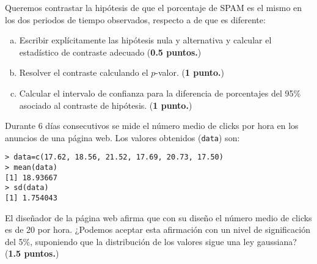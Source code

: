 \documentclass[12pt]{article}\usepackage[]{graphicx}\usepackage[]{color}
\newcounter{problemes}
\newcounter{punts} \def\thepunts{\arabic{punts}}
\def\probl{\addtocounter{problemes}{1} \setcounter{punts}{0}
\medskip\noindent{\bf \theproblemes) }}
\begin{document}
Queremos contrastar la hipótesis de que el porcentaje de SPAM es el mismo en los
dos periodos de tiempo observados, respecto a de que es diferente:

\begin{enumerate}[a)]
\item Escribir explícitamente las hipótesis nula y alternativa y calcular el estadístico de contraste adecuado  (\textbf{0.5 puntos.})
\item Resolver el contraste calculando el $p$-valor.  (\textbf{1 punto.})
\item Calcular el intervalo de confianza para la diferencia de porcentajes del 95\% asociado al contraste de hipótesis. (\textbf{1 punto.})
\end{enumerate}


\probl Durante 6 días consecutivos se mide el número medio de clicks por hora en los anuncios de una página web.
Los valores obtenidos (\texttt{data}) son:

\begin{verbatim}
> data=c(17.62, 18.56, 21.52, 17.69, 20.73, 17.50)
> mean(data)
[1] 18.93667
> sd(data)
[1] 1.754043
\end{verbatim}


El diseñador de la página web afirma que con su diseño el número medio de clicks es de 20 por hora. ¿Podemos
aceptar esta afirmación con un nivel de significación del 5\%,
suponiendo que la distribución de los valores sigue una ley gaussiana?
(\textbf{1.5 puntos.})
\end{document}
